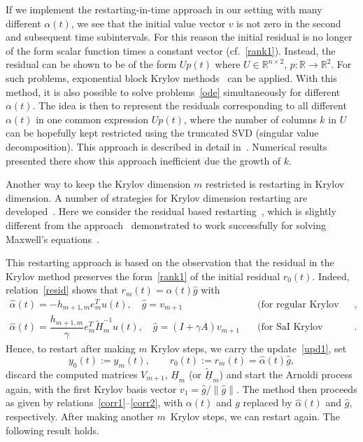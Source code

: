 \documentclass[11pt]{elsarticle}
\newcommand{\alphah}{\widehat{\alpha}}
\newcommand{\gh}{\widehat{g}}
\newcommand{\Hh}{\underline{H}}
\newcommand{\Hht}{\underline{\tilde{H}}}
\newcommand{\Rr}{\mathbb{R}}
\begin{document}
If we implement the restarting-in-time approach in our setting 
with many different $\alpha(t)$, 
we see that the initial value vector $v$ is not zero
in the second and subsequent time subintervals.  For this reason
the initial residual is no longer of the form scalar function
times a constant vector (cf.~\eqref{rank1}).  Instead, the residual
can be shown to be of the form $Up(t)$ where $U\in\Rr^{n\times 2}$,
$p: \Rr\rightarrow\Rr^2$.
For such problems, exponential block 
Krylov methods~\cite{Botchev2013,FrommerLundSzyld2017}
can be applied.  
With this method, it is also possible to solve problems~\eqref{ode}
simultaneously for different $\alpha(t)$.
The idea is then to represent the residuals 
corresponding to all different $\alpha(t)$ in one common expression
$Up(t)$, where the number of columns $k$ in $U$ can be  hopefully kept 
restricted using the truncated SVD (singular value decomposition).
This approach is described in detail in~\cite{Hanse2017_MSc}.
Numerical results presented there show this approach 
inefficient due the growth of $k$.

Another way to keep the Krylov dimension $m$ restricted is 
restarting in Krylov dimension.  A number of strategies
for Krylov dimension restarting are 
developed~\cite{TalEzer2007,Afanasjew_ea08,Eiermann_ea2011,%
PhD_Niehoff,BGH13,GuettelFrommerSchweitzer2014}.  
Here we consider the residual based restarting~\cite{BGH13},
which is slightly different from the approach~\cite{PhD_Niehoff} 
demonstrated to work successfully for solving Maxwell's
equations~\cite{Botchev2016}.

This restarting approach is based on the observation that
the residual in the Krylov method preserves the form~\eqref{rank1} 
of the initial residual $r_0(t)$.  Indeed, relation~\eqref{resid}
shows that $r_m(t) = \alphah(t)\gh$ with
$$
\begin{aligned}
\alphah(t)=-h_{m+1,m} e_m^Tu(t), \quad
\gh =v_{m+1}
\quad &\text{(for regular Krylov method)},
\\  
\alphah(t)=\dfrac{h_{m+1,m}}{\gamma} e_m^T \tilde{H}_m^{-1} u(t),
\quad
\gh =(I+\gamma A)v_{m+1}
\quad &\text{(for SaI Krylov method)}.
\end{aligned}
$$
Hence, to restart after making $m$ Krylov steps, 
we carry the update~\eqref{upd1}, set
\begin{equation}
\label{rst}  
y_0(t):= y_m(t), \qquad r_0(t):= r_m(t)=\alphah(t)\gh,
\end{equation}
discard the computed matrices $V_{m+1}$, $\Hh_m$ (or $\Hht_m$)  
and start the Arnoldi process again, with the first Krylov
basis vector $v_1=\gh/\|\gh\|$.
The method then proceeds as given by 
relations~\eqref{corr1}--\eqref{corr2}, with
$\alpha(t)$ and $g$ replaced by  $\alphah(t)$ and $\gh$,
respectively.
After making another $m$~Krylov steps, we can restart again.
The following result holds.
\end{document}
